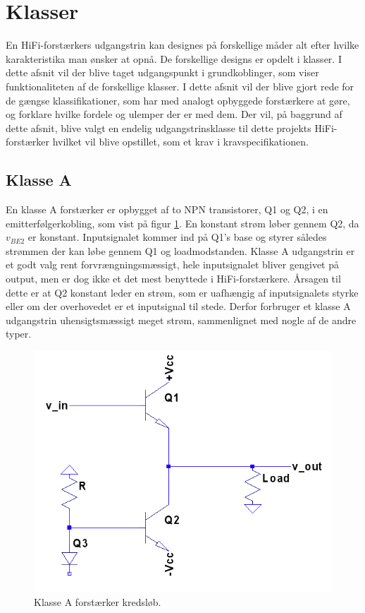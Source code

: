 \section{Klasser}
En HiFi-forstærkers udgangstrin kan designes på forskellige måder alt efter hvilke karakteristika man ønsker at opnå. De forskellige designs er opdelt i klasser. I dette afsnit vil der blive taget udgangspunkt i grundkoblinger, som viser funktionaliteten af de forskellige klasser. 
I dette afsnit vil der blive gjort rede for de gængse klassifikationer, som har med analogt opbyggede forstærkere at gøre, og forklare hvilke fordele og ulemper der er med dem. Der vil, på baggrund af dette afsnit, blive valgt en endelig udgangstrinsklasse til dette projekts HiFi-forstærker hvilket vil blive opstillet, som et krav i kravspecifikationen.

\subsection{Klasse A}

En klasse A forstærker er opbygget af to NPN transistorer, Q1 og Q2, i en emitterfølgerkobling, som vist på figur \ref{fig:classa}. En konstant strøm løber gennem Q2, da $v_{BE2}$ er konstant. Inputsignalet kommer ind på Q1's base og styrer således strømmen der kan løbe gennem Q1 og loadmodstanden. 
Klasse A udgangstrin er et godt valg rent forvrængningsmæssigt, hele inputsignalet bliver gengivet på output, men er dog ikke et det mest benyttede i HiFi-forstærkere. Årsagen til dette er at Q2 konstant leder en strøm, som er uafhængig af inputsignalets styrke eller om der overhovedet er et inputsignal til stede. Derfor forbruger et klasse A udgangstrin uhensigtsmæssigt meget strøm, sammenlignet med nogle af de andre typer. 

\begin{figure}[h]
\centering
\includegraphics[scale=.35]{klasser/classa.png}
\caption{Klasse A forstærker kredsløb.}
\label{fig:classa}
\end{figure}


